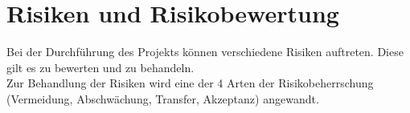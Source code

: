 \chapter{Risiken und Risikobewertung}
Bei der Durchführung des Projekts können verschiedene Risiken auftreten. Diese gilt es zu bewerten und zu behandeln. \\
Zur Behandlung der Risiken wird eine der 4 Arten der Risikobeherrschung (Vermeidung, Abschwächung, Transfer, Akzeptanz) angewandt.
